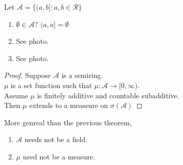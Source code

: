 \documentclass[11pt,fleqn]{book} %
\begin{document}
\begin{example}
	Let $ \mathcal{A} = \{(a, b]: a, b \in \mathcal{R} \}$

		\begin{enumerate}
			\item $\emptyset \in \mathcal{A}$? $(a,a] = \emptyset$
			\item See photo.
			\item See photo.
		\end{enumerate}
\end{example}

\begin{proof}
	Suppose $\mathcal{A}$ is a semiring. \\
	$\mu$ is a set function such that $\mu : \mathcal{A} \rightarrow [0, \infty)$.\\

	Assume $\mu$ is finitely additive and countable subadditive.\\

	Then $\mu$ extends to a meassure on $\sigma(\mathcal{A})$
\end{proof}

More genreal than the previous theorem, 

	\begin{enumerate}
		\item $\mathcal{A}$ needs not be a field. 
		\item $\mu$ need not be a measure. 
	\end{enumerate}
\end{document}
